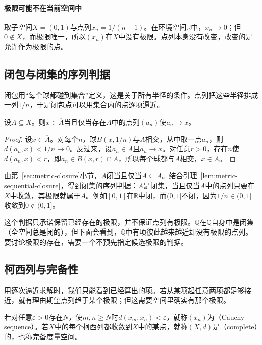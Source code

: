 \paragraph{极限可能不在当前空间中}
取子空间$X=(0,1)$与点列$x_n=1/(n+1)$。在环境空间$\mathbb R$中，$x_n\to0$；但$0\notin X$，而极限唯一，所以$(x_n)$在$X$中没有极限。点列本身没有改变，改变的是允许作为极限的点。

\subsection{闭包与闭集的序列判据}
\label{sec:metric-sequential-closure}

闭包用“每个球都碰到集合”定义，这是关于所有半径的条件。点列把这些半径排成一列$1/n$，于是闭包点可以用集合内的点逐项逼近。

\begin{lemma}[闭包的序列判据]
\label{lem:metric-sequential-closure}
设$A\subseteq X$。则$x\in\overline A$当且仅当存在$A$中的点列$(a_n)$使$a_n\to x$。
\end{lemma}

\begin{proof}
设$x\in\overline A$。对每个$n$，球$B(x,1/n)$与$A$相交，从中取一点$a_n$，则$d(a_n,x)<1/n\to0$。反过来，设$a_n\in A$且$a_n\to x$。对任意$r>0$，存在$n$使$d(a_n,x)<r$，即$a_n\in B(x,r)\cap A$，所以每个球都与$A$相交，$x\in\overline A$。
\end{proof}

由第~\ref{sec:metric-closure}小节，$A$闭当且仅当$\overline A\subseteq A$。结合引理~\ref{lem:metric-sequential-closure}，得到闭集的序列判据：$A$是闭集，当且仅当$A$中的点列只要在$X$中收敛，其极限就属于$A$。例如$[0,1]$在$\mathbb R$中闭，而$(0,1]$不闭，因为$1/n\in(0,1]$收敛到$0\notin(0,1]$。

这个判据只承诺保留已经存在的极限，并不保证点列有极限。$\mathbb Q$在$\mathbb Q$自身中是闭集（全空间总是闭的），但下面会看到，$\mathbb Q$中有项彼此越来越近却没有极限的点列。要讨论极限的存在，需要一个不预先指定候选极限的判据。

\subsection{柯西列与完备性}
\label{sec:metric-cauchy}

用逐次逼近求解时，我们只能看到已经算出的项。若从某项起任意两项都足够接近，就有理由期望点列趋于某个极限；但这需要空间里确实有那个极限。

\begin{definition}[柯西列与完备空间]
\label{def:metric-complete}
若对任意$\varepsilon>0$存在$N$，使$m,n\geq N$时$d(x_m,x_n)<\varepsilon$，就称$(x_n)$为（Cauchy sequence）。若$X$中的每个柯西列都收敛到$X$中的某点，就称$(X,d)$是（complete）的，也称完备度量空间。
\end{definition}

